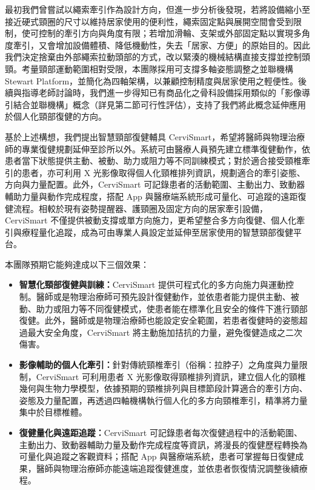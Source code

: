 \documentclass[12pt,a4paper]{article}
\begin{document}
最初我們曾嘗試以繩索牽引作為設計方向，但進一步分析後發現，若將設備縮小至接近硬式頸圈的尺寸以維持居家使用的便利性，繩索固定點與展開空間會受到限制，使可控制的牽引方向與角度有限；若增加滑輪、支架或外部固定點以實現多角度牽引，又會增加設備體積、降低機動性，失去「居家、方便」的原始目的。因此我們決定捨棄由外部繩索拉動頭部的方式，改以緊湊的機械結構直接支撐並控制頭頸。考量頸部運動範圍相對受限，本團隊採用可支撐多軸姿態調整之並聯機構 Stewart Platform\cite{stewart1965}，並簡化為四軸架構，以兼顧控制精度與居家使用之輕便性。後續與指導老師討論時，我們進一步得知已有商品化之骨科設備採用類似的「影像導引結合並聯機構」概念（詳見第二節可行性評估），支持了我們將此概念延伸應用於個人化頸部復健的方向。

基於上述構想，我們提出智慧頸部復健輔具 CerviSmart，希望將醫師與物理治療師的專業復健規劃延伸至診所以外。系統可由醫療人員預先建立標準復健動作，依患者當下狀態提供主動、被動、助力或阻力等不同訓練模式；對於適合接受頸椎牽引的患者，亦可利用 X 光影像取得個人化頸椎排列資訊，規劃適合的牽引姿態、方向與力量配置。此外，CerviSmart 可記錄患者的活動範圍、主動出力、致動器輔助力量與動作完成程度，搭配 App 與醫療端系統形成可量化、可追蹤的遠距復健流程。相較於現有姿勢提醒器、護頸圈及固定方向的居家牽引設備，CerviSmart 不僅提供被動支撐或單方向施力，更希望整合多方向復健、個人化牽引與療程量化追蹤，成為可由專業人員設定並延伸至居家使用的智慧頸部復健平台。

本團隊預期它能夠達成以下三個效果：

\begin{itemize}
    \item \textbf{智慧化頸部復健與訓練：}CerviSmart 提供可程式化的多方向施力與運動控制。醫師或是物理治療師可預先設計復健動作，並依患者能力提供主動、被動、助力或阻力等不同復健模式，使患者能在標準化且安全的條件下進行頸部復健。此外，醫師或是物理治療師也能設定安全範圍，若患者復健時的姿態超過最大安全角度，CerviSmart 將主動施加拮抗的力量，避免復健造成之二次傷害。

    \item \textbf{影像輔助的個人化牽引：}針對傳統頸椎牽引（俗稱：拉脖子）之角度與力量限制，CerviSmart 可利用患者 X 光影像取得頸椎排列資訊，建立個人化的頸椎幾何與生物力學模型，依據預期的頸椎排列與目標節段計算適合的牽引方向、姿態及力量配置，再透過四軸機構執行個人化的多方向頸椎牽引，精準將力量集中於目標椎體。

    \item \textbf{復健量化與遠距追蹤：}CerviSmart 可記錄患者每次復健過程中的活動範圍、主動出力、致動器輔助力量及動作完成程度等資訊，將漫長的復健歷程轉換為可量化與追蹤之客觀資料；搭配 App 與醫療端系統，患者可掌握每日復健成果，醫師與物理治療師亦能遠端追蹤復健進度，並依患者恢復情況調整後續療程。
\end{itemize}
\end{document}
